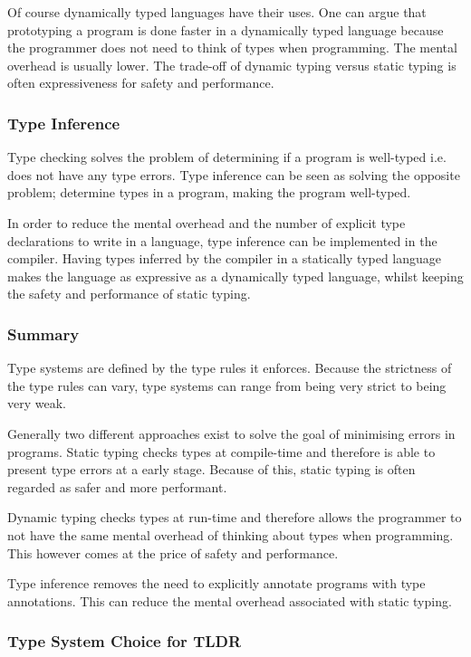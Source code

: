 Of course dynamically typed languages have their uses. One can argue that prototyping a program is done faster in a dynamically typed language because the programmer does not need to think of types when programming. The mental overhead is usually lower. The trade-off of dynamic typing versus static typing is often expressiveness for safety and performance.

\subsubsection{Type Inference}
Type checking solves the problem of determining if a program is well-typed i.e. does not have any type errors. Type inference can be seen as solving the opposite problem; determine types in a program, making the program well-typed.

In order to reduce the mental overhead and the number of explicit type declarations to write in a language, type inference can be implemented in the compiler. Having types inferred by the compiler in a statically typed language makes the language as expressive as a dynamically typed language, whilst keeping the safety and performance of static typing.

\subsubsection{Summary}
Type systems are defined by the type rules it enforces. Because the strictness of the type rules can vary, type systems can range from being very strict to being very weak.

Generally two different approaches exist to solve the goal of minimising errors in programs. Static typing checks types at compile-time and therefore is able to present type errors at a early stage. Because of this, static typing is often regarded as safer and more performant.

Dynamic typing checks types at run-time and therefore allows the programmer to not have the same mental overhead of thinking about types when programming. This however comes at the price of safety and performance.

Type inference removes the need to explicitly annotate programs with type annotations. This can reduce the mental overhead associated with static typing.

\subsubsection{Type System Choice for TLDR}


